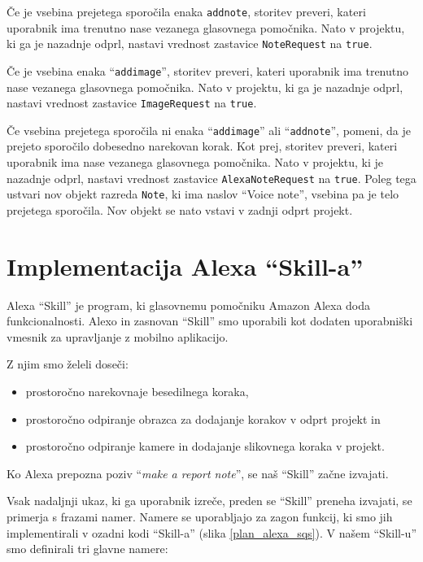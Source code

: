\documentclass[a4paper, 12pt]{book}
\begin{document}
Če je vsebina prejetega sporočila enaka \texttt{addnote}, storitev preveri, kateri uporabnik ima trenutno nase vezanega glasovnega pomočnika.
Nato v projektu, ki ga je nazadnje odprl, nastavi vrednost zastavice \texttt{NoteRequest} na \texttt{true}.


Če je vsebina enaka \enquote{\texttt{addimage}}, storitev preveri, kateri uporabnik ima trenutno nase vezanega glasovnega pomočnika.
Nato v projektu, ki ga je nazadnje odprl, nastavi vrednost zastavice \texttt{ImageRequest} na \texttt{true}.

Če vsebina prejetega sporočila ni enaka \enquote{\texttt{addimage}} ali \enquote{\texttt{addnote}}, pomeni, da je prejeto sporočilo dobesedno narekovan korak.
Kot prej, storitev preveri, kateri uporabnik ima nase vezanega glasovnega pomočnika.
Nato v projektu, ki je nazadnje odprl, nastavi vrednost zastavice \texttt{AlexaNoteRequest} na \texttt{true}.
Poleg tega ustvari nov objekt razreda \texttt{Note}, ki ima naslov \enquote{Voice note}, vsebina pa je telo prejetega sporočila.
Nov objekt se nato vstavi v zadnji odprt projekt.



\section{Implementacija Alexa \enquote{Skill-a}}

Alexa \enquote{Skill} je program, ki glasovnemu pomočniku Amazon Alexa doda funkcionalnosti.
Alexo in zasnovan \enquote{Skill} smo uporabili kot dodaten uporabniški vmesnik za upravljanje z mobilno aplikacijo.

\noindent Z njim smo želeli doseči:
\begin{itemize}
	\item prostoročno narekovnaje besedilnega koraka,
	\item prostoročno odpiranje obrazca za dodajanje korakov v odprt projekt in
	\item prostoročno odpiranje kamere in dodajanje slikovnega koraka v projekt.
\end{itemize}



Ko Alexa prepozna poziv \enquote{\textit{make a report note}}, se naš \enquote{Skill} začne izvajati.

Vsak nadaljnji ukaz, ki ga uporabnik izreče, preden se \enquote{Skill} preneha izvajati, se primerja s frazami namer.
Namere se uporabljajo za zagon funkcij, ki smo jih implementirali v ozadni kodi \enquote{Skill-a} (slika \ref{plan_alexa_sqs}).
V našem \enquote{Skill-u} smo definirali tri glavne namere:
\end{document}
